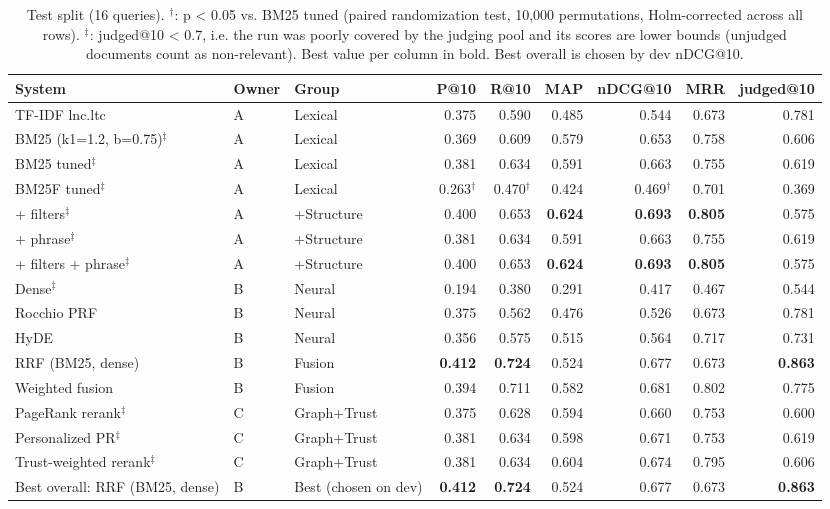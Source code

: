 \begin{table}[t]
\centering
\small
\begin{tabular}{lllrrrrrr}
\toprule
System & Owner & Group & P@10 & R@10 & MAP & nDCG@10 & MRR & judged@10 \\
\midrule
TF-IDF lnc.ltc & A & Lexical & 0.375 & 0.590 & 0.485 & 0.544 & 0.673 & 0.781 \\
BM25 (k1=1.2, b=0.75)$^\ddagger$ & A & Lexical & 0.369 & 0.609 & 0.579 & 0.653 & 0.758 & 0.606 \\
BM25 tuned$^\ddagger$ & A & Lexical & 0.381 & 0.634 & 0.591 & 0.663 & 0.755 & 0.619 \\
BM25F tuned$^\ddagger$ & A & Lexical & 0.263$^\dagger$ & 0.470$^\dagger$ & 0.424 & 0.469$^\dagger$ & 0.701 & 0.369 \\
\midrule
+ filters$^\ddagger$ & A & +Structure & 0.400 & 0.653 & \textbf{0.624} & \textbf{0.693} & \textbf{0.805} & 0.575 \\
+ phrase$^\ddagger$ & A & +Structure & 0.381 & 0.634 & 0.591 & 0.663 & 0.755 & 0.619 \\
+ filters + phrase$^\ddagger$ & A & +Structure & 0.400 & 0.653 & \textbf{0.624} & \textbf{0.693} & \textbf{0.805} & 0.575 \\
\midrule
Dense$^\ddagger$ & B & Neural & 0.194 & 0.380 & 0.291 & 0.417 & 0.467 & 0.544 \\
Rocchio PRF & B & Neural & 0.375 & 0.562 & 0.476 & 0.526 & 0.673 & 0.781 \\
HyDE & B & Neural & 0.356 & 0.575 & 0.515 & 0.564 & 0.717 & 0.731 \\
\midrule
RRF (BM25, dense) & B & Fusion & \textbf{0.412} & \textbf{0.724} & 0.524 & 0.677 & 0.673 & \textbf{0.863} \\
Weighted fusion & B & Fusion & 0.394 & 0.711 & 0.582 & 0.681 & 0.802 & 0.775 \\
\midrule
PageRank rerank$^\ddagger$ & C & Graph+Trust & 0.375 & 0.628 & 0.594 & 0.660 & 0.753 & 0.600 \\
Personalized PR$^\ddagger$ & C & Graph+Trust & 0.381 & 0.634 & 0.598 & 0.671 & 0.753 & 0.619 \\
Trust-weighted rerank$^\ddagger$ & C & Graph+Trust & 0.381 & 0.634 & 0.604 & 0.674 & 0.795 & 0.606 \\
\midrule
Best overall: RRF (BM25, dense) & B & Best (chosen on dev) & \textbf{0.412} & \textbf{0.724} & 0.524 & 0.677 & 0.673 & \textbf{0.863} \\
\bottomrule
\end{tabular}
\caption{Test split (16 queries). $^\dagger$: p < 0.05 vs. BM25 tuned (paired randomization test, 10,000 permutations, Holm-corrected across all rows). $^\ddagger$: judged@10 < 0.7, i.e. the run was poorly covered by the judging pool and its scores are lower bounds (unjudged documents count as non-relevant). Best value per column in bold. Best overall is chosen by dev nDCG@10.}
\label{tab:ablation-test}
\end{table}
